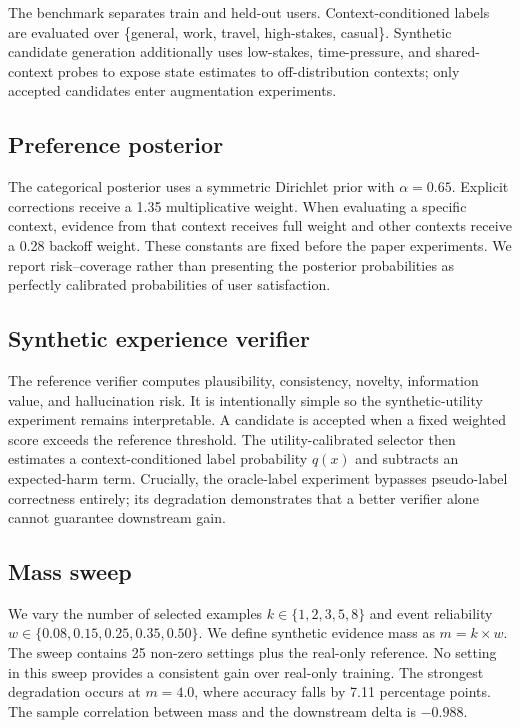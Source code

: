\documentclass[10pt,twocolumn]{article}
\begin{document}
The benchmark separates train and held-out users. Context-conditioned labels are evaluated over \{general, work, travel, high-stakes, casual\}. Synthetic candidate generation additionally uses low-stakes, time-pressure, and shared-context probes to expose state estimates to off-distribution contexts; only accepted candidates enter augmentation experiments.

\subsection{Preference posterior}
The categorical posterior uses a symmetric Dirichlet prior with $\alpha=0.65$. Explicit corrections receive a 1.35 multiplicative weight. When evaluating a specific context, evidence from that context receives full weight and other contexts receive a 0.28 backoff weight. These constants are fixed before the paper experiments. We report risk--coverage rather than presenting the posterior probabilities as perfectly calibrated probabilities of user satisfaction.

\subsection{Synthetic experience verifier}
The reference verifier computes plausibility, consistency, novelty, information value, and hallucination risk. It is intentionally simple so the synthetic-utility experiment remains interpretable. A candidate is accepted when a fixed weighted score exceeds the reference threshold. The utility-calibrated selector then estimates a context-conditioned label probability $q(x)$ and subtracts an expected-harm term. Crucially, the oracle-label experiment bypasses pseudo-label correctness entirely; its degradation demonstrates that a better verifier alone cannot guarantee downstream gain.

\subsection{Mass sweep}
We vary the number of selected examples $k\in\{1,2,3,5,8\}$ and event reliability $w\in\{0.08,0.15,0.25,0.35,0.50\}$. We define synthetic evidence mass as $m=k\times w$. The sweep contains 25 non-zero settings plus the real-only reference. No setting in this sweep provides a consistent gain over real-only training. The strongest degradation occurs at $m=4.0$, where accuracy falls by 7.11 percentage points. The sample correlation between mass and the downstream delta is $-0.988$.
\end{document}
